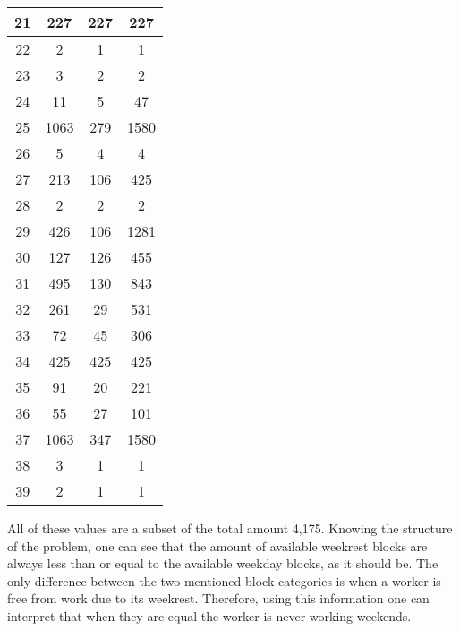 \begin{table}[!h]
\begin{tabular}{|c|ccc|}
21     & 227     & 227      & 227     \\ \hline
22     & 2       & 1        & 1       \\ \hline
23     & 3       & 2        & 2       \\ \hline
24     & 11      & 5        & 47      \\ \hline
25     & 1063    & 279      & 1580    \\ \hline
26     & 5       & 4        & 4       \\ \hline
27     & 213     & 106      & 425     \\ \hline
28     & 2       & 2        & 2       \\ \hline
29     & 426     & 106      & 1281    \\ \hline
30     & 127     & 126      & 455     \\ \hline
31     & 495     & 130      & 843     \\ \hline
32     & 261     & 29       & 531     \\ \hline
33     & 72      & 45       & 306     \\ \hline
34     & 425     & 425      & 425     \\ \hline
35     & 91      & 20       & 221     \\ \hline
36     & 55      & 27       & 101     \\ \hline
37     & 1063    & 347      & 1580    \\ \hline
38     & 3       & 1        & 1       \\ \hline
39     & 2       & 1        & 1       \\ \hline
\end{tabular}
\end{table}

All of these values are a subset of the total amount 4,175. Knowing the structure of the problem, one can see that the amount of available weekrest blocks are always less than or equal to the available weekday blocks, as it should be. The only difference between the two mentioned block categories is when a worker is free from work due to its weekrest. Therefore, using this information one can interpret that when they are equal the worker is never working weekends.


